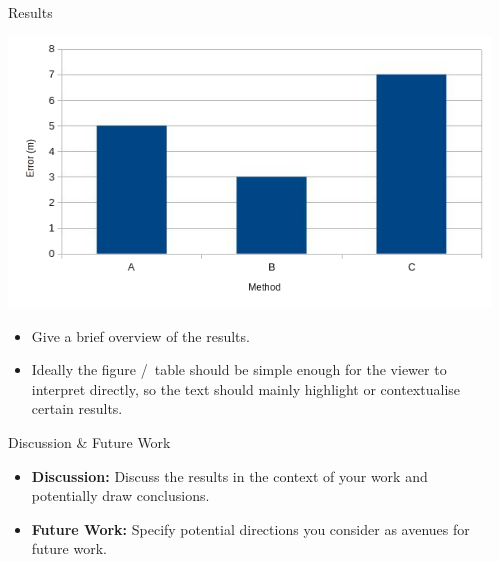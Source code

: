 \documentclass[final,hyperref={pdfpagelabels=false}]{beamer}
\newcommand{\shrink}{-15pt}
\begin{document}
\begin{frame}[t]
\begin{columns}[t]

  \begin{column}{.015\textwidth}\end{column} %


  \begin{column}{.49\textwidth} %
    \vspace{\shrink} 
    
    \vspace{-1cm}

    \begin{block}{Results}
      \begin{center}
      \includegraphics[width=0.925\linewidth]{example_graph.png}
      \end{center}
      \begin{itemize}
          \item Give a brief overview of the results.
          \item Ideally the figure \slash\ table should be simple enough for the viewer to interpret directly, so the text should mainly highlight or contextualise certain results.
      \end{itemize}
    \end{block}
    
    \vspace{-1.05cm}

    \begin{block}{Discussion \& Future Work}
    \begin{itemize}
        \item \textbf{Discussion:} Discuss the results in the context of your work and potentially draw conclusions.
        \item \textbf{Future Work:} Specify potential directions you consider as avenues for future work.
    \end{itemize}
    \end{block}


\end{column}
\end{columns}
\end{frame}
\end{document}
